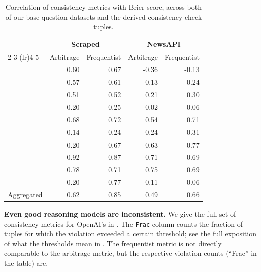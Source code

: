 \begin{table}[hbp]
    \centering
   \caption{Correlation of consistency metrics with Brier score, across both of our base question datasets and the derived consistency check tuples.}
   \label{cfc:tab:consistency-correlations}
   \small
   \begin{tabular}{lrrrr}
     \toprule
     & \multicolumn{2}{c}{Scraped} & \multicolumn{2}{c}{NewsAPI} \\
     \cmidrule(lr){2-3} \cmidrule(lr){4-5}
     & Arbitrage & Frequentist & Arbitrage & Frequentist \\
     \midrule
     \NegChecker{} & 0.60 & 0.67 & -0.36 & -0.13 \\
     \ParaphraseChecker{} & 0.57 & 0.61 & 0.13 & 0.24 \\
     \ConsequenceChecker{} & 0.51 & 0.52 & 0.21 & 0.30 \\
     \AndOrChecker{} & 0.20 & 0.25 & 0.02 & 0.06 \\
     \AndChecker{} & 0.68 & 0.72 & 0.54 & 0.71 \\
     \OrChecker{} & 0.14 & 0.24 & -0.24 & -0.31 \\
     \ButChecker{} & 0.20 & 0.67 & 0.63 & 0.77 \\
     \CondChecker{} & 0.92 & 0.87 & 0.71 & 0.69 \\
     \CondCondChecker{} & 0.78 & 0.71 & 0.75 & 0.69 \\
     \ExpectedEvidenceChecker{} & 0.20 & 0.77 & -0.11 & 0.06 \\
     Aggregated & 0.62 & 0.85 & 0.49 & 0.66 \\
     \bottomrule
   \end{tabular}
 \end{table}


\textbf{Even good reasoning models are inconsistent.}
We give the full set of consistency metrics for OpenAI's \oonemini{} in .
The \texttt{Frac} column counts the fraction of tuples for which the violation exceeded a certain threshold; see the full exposition of what the thresholds mean in .
The frequentist metric is not directly comparable to the arbitrage metric, but the respective violation counts (``Frac'' in the table) are.


